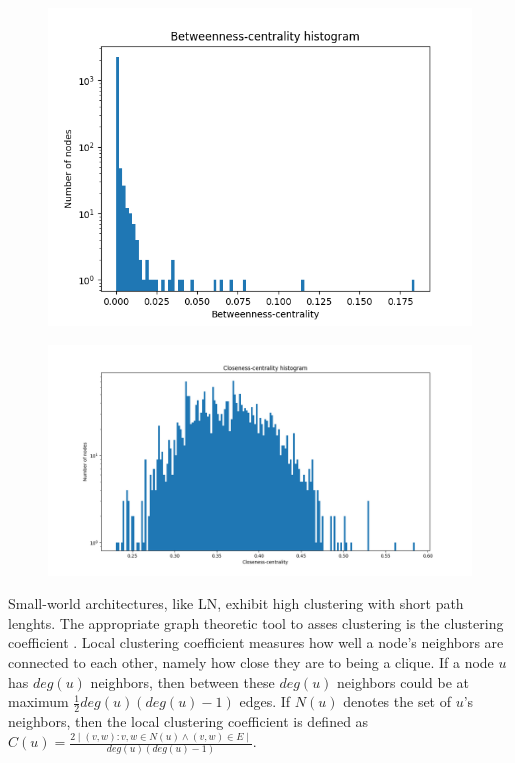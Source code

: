 \documentclass[a4paper]{article}
\theoremstyle{definition}
\begin{document}
\begin{figure}[h]
	\centering
	\begin{minipage}{.6\textwidth}
		\centering
		\includegraphics[width=\linewidth]{betweennessCentrality.png}
		\label{fig:betweennescentrality}
	\end{minipage}%
	\begin{minipage}{.6\textwidth}
		\centering
		\includegraphics[width=\linewidth]{closenessCentrality.png}
		\label{fig:closenesscentrality}
	\end{minipage}
\end{figure}

Small-world architectures, like LN, exhibit high clustering with short path lenghts. The appropriate graph theoretic tool to asses clustering is the clustering coefficient \cite{watts1998collective}. Local clustering coefficient measures how well a node's neighbors are connected to each other, namely how close they are to being a clique. If a node $u$ has $deg(u)$ neighbors, then between these $deg(u)$ neighbors could be at maximum $\frac{1}{2}deg(u)(deg(u)-1)$ edges. If $N(u)$ denotes the set of $u$'s neighbors, then the local clustering coefficient is defined as $C(u)=\frac{2\mid (v,w): v,w \in N(u) \land (v,w) \in E \mid}{deg(u)(deg(u)-1)}$. 
\end{document}
